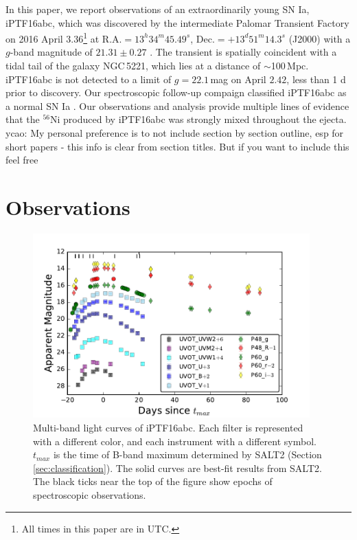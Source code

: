 \documentclass[twocolumn]{aastex61}
\newcommand{\ycao}[1]{{\color{red} ycao: {#1}}}
\begin{document}
In this paper, we report observations of an extraordinarily young SN
Ia, iPTF16abc, which was discovered by the intermediate Palomar
Transient Factory on 2016 April $3.36$\footnote{All times in this
  paper are in UTC.} at $\textrm{R.A.}=13^h34^m45.49^s$,
$\textrm{Dec.}=+13^d51^m14.3^s$ (J2000) with a $g$-band magnitude of
$21.31\pm0.27$ \citep{2016PASP..128k4502C,2016ATel.8907....1M}. The
transient is spatially coincident with a tidal tail of the galaxy
NGC\,5221, which lies at a distance of $\sim$100\,Mpc. iPTF16abc is not detected to a limit of $g=22.1$\,mag on April $2.42$, less than 1 d prior to discovery. Our spectroscopic follow-up
compaign classified iPTF16abc as a normal SN Ia
\citep{2016ATel.8909....1C}. Our observations and analysis provide multiple lines of evidence that the $^{56}$Ni produced by iPTF16abc was strongly mixed throughout the ejecta. 
\ycao{My personal preference is to not include section by section outline, esp for short papers - this info is clear from section titles. But if you want to include this feel free}


\section{Observations}
\label{sec:obs}

\begin{figure}[htb]
  \centering
  \includegraphics[width=0.95\textwidth]{lightcurve.pdf}
  \caption{Multi-band light curves of iPTF16abc. Each filter is
  represented with a different color, and each instrument with a 
  different symbol. $t_{max}$ is the time of B-band maximum
    determined by SALT2 (Section \ref{sec:classification}). The solid
    curves are best-fit results from SALT2. The black ticks near the
    top of the figure show epochs of spectroscopic observations.}
  \label{fig:lightcurve}
\end{figure}
\end{document}
